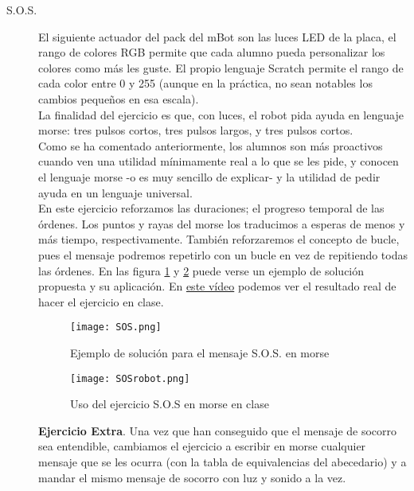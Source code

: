 \begin{description}
\item [S.O.S.]\label{ej:sos}
El siguiente actuador del pack del mBot son las luces LED de la placa, el rango de colores RGB permite que cada alumno pueda personalizar los colores como más les guste. El propio lenguaje Scratch permite el rango de cada color entre 0 y 255 (aunque en la práctica, no sean notables los cambios pequeños en esa escala).\\
La finalidad del ejercicio es que, con luces, el robot pida ayuda en lenguaje morse: tres pulsos cortos, tres pulsos largos, y tres pulsos cortos. \\
Como se ha comentado anteriormente, los alumnos son más proactivos cuando ven una utilidad mínimamente real a lo que se les pide, y conocen el lenguaje morse -o es muy sencillo de explicar- y la utilidad de pedir ayuda en un lenguaje universal.\\
En este ejercicio reforzamos las duraciones; el progreso temporal de las órdenes. Los puntos y rayas del morse los traducimos a esperas de menos y más tiempo, respectivamente. También reforzaremos el concepto de bucle, pues el mensaje podremos repetirlo con un bucle en vez de repitiendo todas las órdenes.  En las figura \ref{img:SOS} y \ref{img:SOSrobot} puede verse un ejemplo de solución propuesta y su aplicación. En \href{https://www.youtube.com/watch?v=k6QSnIkRVyo}{este vídeo} podemos ver el resultado real de hacer el ejercicio en clase. \\
\begin{figure}[h]
	\centering
	\texttt{[image: SOS.png]}	
	\caption{Ejemplo de solución para el mensaje S.O.S. en morse}
	\label{img:SOS}
\end{figure}
\begin{figure}[h]
	\centering
	\texttt{[image: SOSrobot.png]}	
	\caption{Uso del ejercicio S.O.S en morse en clase}
	\label{img:SOSrobot}
\end{figure}
\textbf{Ejercicio Extra}. Una vez que han conseguido que el mensaje de socorro sea entendible, cambiamos el ejercicio a escribir en morse cualquier mensaje que se les ocurra (con la tabla de equivalencias del abecedario) y a mandar el mismo mensaje de socorro con luz y sonido a la vez.


\end{description}
